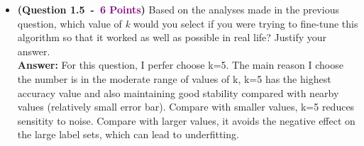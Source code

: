 \documentclass{article}
\newcommand{\POINTS}[1]{\textcolor{purple}{\textbf{{#1}}}}
\begin{document}
\begin{itemize}
\begin{enumerate}
\item \textbf{For moderate k} (approximately from $3$ to $29$), which the accuracy is highest and the model is kind of stable.
\end{enumerate}



        \item \textbf{(Question 1.5~-~\POINTS{6 Points})} Based on the analyses made in the previous question, which value of \textit{k} would you select if you were trying to fine-tune this algorithm so that it worked as well as possible in real life? Justify your answer.
\\
\textbf{Answer:}
For this question, I perfer choose k=5. The main reason I choose the number is in the moderate range of values of k, k=5 has the highest accuracy value and also maintaining good stability compared with nearby values (relatively small error bar).
Compare with smaller values, k=5 reduces sensitity to noise. Compare with larger values, it avoids the negative effect on the large label sets, which can lead to underfitting.





\end{itemize}
\end{document}
